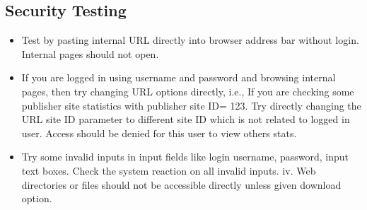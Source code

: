 \subsection{Security Testing}
\begin{itemize}


\item Test by pasting internal URL directly into browser address bar without login.
Internal pages should not open.
\item If you are logged in using username and password and browsing internal pages,
then try changing URL options directly, i.e., If you are checking some publisher site
statistics with publisher site ID= 123. Try directly changing the URL site ID parameter
to different site ID which is not related to logged in user. Access should be denied for
this user to view others stats.
\item Try some invalid inputs in input fields like login username, password, input text
boxes. Check the system reaction on all invalid inputs.
iv. Web directories or files should not be accessible directly unless given download
option.
\end{itemize}

